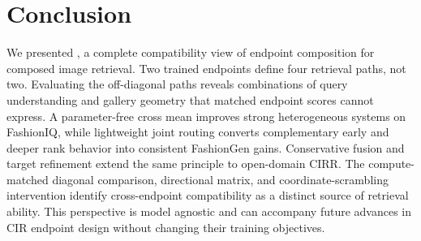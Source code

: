\section{Conclusion}
\label{sec:conclusion}

We presented \method, a complete compatibility view of endpoint composition for composed image retrieval. Two trained endpoints define four retrieval paths, not two. Evaluating the off-diagonal paths reveals combinations of query understanding and gallery geometry that matched endpoint scores cannot express. A parameter-free cross mean improves strong heterogeneous systems on FashionIQ, while lightweight joint routing converts complementary early and deeper rank behavior into consistent FashionGen gains. Conservative fusion and target refinement extend the same principle to open-domain CIRR. The compute-matched diagonal comparison, directional matrix, and coordinate-scrambling intervention identify cross-endpoint compatibility as a distinct source of retrieval ability. This perspective is model agnostic and can accompany future advances in CIR endpoint design without changing their training objectives.
